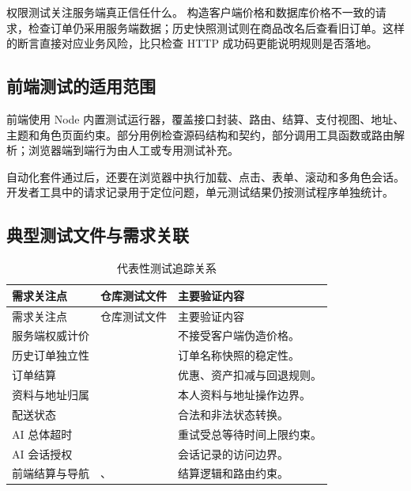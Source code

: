 权限测试关注服务端真正信任什么。 构造客户端价格和数据库价格不一致的请求，检查订单仍采用服务端数据；历史快照测试则在商品改名后查看旧订单。这样的断言直接对应业务风险，比只检查 HTTP 成功码更能说明规则是否落地。
\subsection{前端测试的适用范围}
前端使用 Node 内置测试运行器，覆盖接口封装、路由、结算、支付视图、地址、主题和角色页面约束。部分用例检查源码结构和契约，部分调用工具函数或路由解析；浏览器端到端行为由人工或专用测试补充。

自动化套件通过后，还要在浏览器中执行加载、点击、表单、滚动和多角色会话。开发者工具中的请求记录用于定位问题，单元测试结果仍按测试程序单独统计。
\subsection{典型测试文件与需求关联}
\begin{longtable}{L{.30\linewidth}L{.36\linewidth}L{.25\linewidth}}
\caption{代表性测试追踪关系}\label{tab:test-trace}\\\toprule 需求关注点&仓库测试文件&主要验证内容\\\midrule\endfirsthead\toprule 需求关注点&仓库测试文件&主要验证内容\\\midrule\endhead
服务端权威计价&&不接受客户端伪造价格。\\
历史订单独立性&&订单名称快照的稳定性。\\
订单结算&&优惠、资产扣减与回退规则。\\
资料与地址归属&&本人资料与地址操作边界。\\
配送状态&&合法和非法状态转换。\\
AI 总体超时&&重试受总等待时间上限约束。\\
AI 会话授权&&会话记录的访问边界。\\
前端结算与导航&、&结算逻辑和路由约束。\\\bottomrule
\end{longtable}
